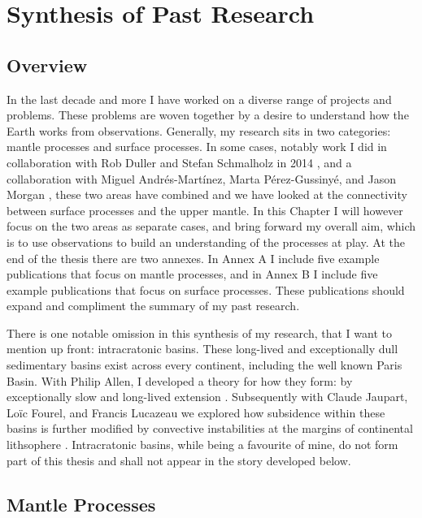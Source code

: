 \chapter{Synthesis of Past Research}

\section{Overview}

In the last decade and more I have worked on a diverse range of projects and problems. These problems are woven together by a desire to understand how the Earth works from observations. Generally, my research sits in two categories: mantle processes and surface processes. In some cases, notably work I did in collaboration with Rob Duller and Stefan Schmalholz in 2014 \citep{armitage-etal-2014}, and a collaboration with Miguel Andrés-Mart\'inez, Marta Pérez-Gussinyé, and Jason Morgan \citep{andres-martinez-etal-2019}, these two areas have combined and we have looked at the connectivity between surface processes and the upper mantle. In this Chapter I will however focus on the two areas as separate cases, and bring forward my overall aim, which is to use observations to build an understanding of the processes at play. At the end of the thesis there are two annexes. In Annex A I include five example publications that focus on mantle processes, and in Annex B I include five example publications that focus on surface processes. These publications should expand and compliment the summary of my past research.

There is one notable omission in this synthesis of my research, that I want to mention up front: intracratonic basins. These long-lived and exceptionally dull sedimentary basins exist across every continent, including the well known Paris Basin. With Philip Allen, I developed a theory for how they form: by exceptionally slow and long-lived extension \citep{armitage-2010,allen-2012}. Subsequently with Claude Jaupart, Loïc Fourel, and Francis Lucazeau we explored how subsidence within these basins is further modified by convective instabilities at the margins of continental lithsophere \citep{armitage-etal-jgr-2013,lucazeau-etal-2015}. Intracratonic basins, while being a favourite of mine, do not form part of this thesis and shall not appear in the story developed below.

\section{Mantle Processes}

